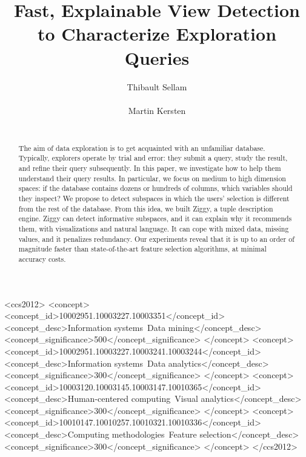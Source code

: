 \documentclass{sig-alternate}
\begin{document}
\title{Fast, Explainable View Detection\\ to Characterize Exploration Queries}

\author{
\alignauthor
Thibault Sellam\\
       \\
\alignauthor
Martin Kersten\\
       \\
}

\maketitle

\begin{abstract} 
The aim of data exploration is to get acquainted with an unfamiliar
database.  Typically, explorers operate by trial and error: they submit a
query, study the result, and refine their query subsequently. In this
paper, we investigate how to help them understand their query results.  In
particular, we focus on medium to high dimension spaces: if the database
contains dozens or hundreds of columns, which variables should they
inspect? We propose to detect subspaces in which the users' selection is
different  from the rest of the database. From this idea, we built Ziggy, a
tuple description engine.  Ziggy can detect informative subspaces, and it
can explain why it recommends them, with visualizations and natural
language.  It can cope with mixed data, missing values, and it penalizes
redundancy. Our experiments reveal that it is up to
an order of magnitude faster than state-of-the-art feature selection
algorithms, at minimal accuracy costs.
\end{abstract}

\begin{CCSXML}
<ccs2012>
<concept>
<concept_id>10002951.10003227.10003351</concept_id>
<concept_desc>Information systems~Data mining</concept_desc>
<concept_significance>500</concept_significance>
</concept>
<concept>
<concept_id>10002951.10003227.10003241.10003244</concept_id>
<concept_desc>Information systems~Data analytics</concept_desc>
<concept_significance>300</concept_significance>
</concept>
<concept>
<concept_id>10003120.10003145.10003147.10010365</concept_id>
<concept_desc>Human-centered computing~Visual analytics</concept_desc>
<concept_significance>300</concept_significance>
</concept>
<concept>
<concept_id>10010147.10010257.10010321.10010336</concept_id>
<concept_desc>Computing methodologies~Feature selection</concept_desc>
<concept_significance>300</concept_significance>
</concept>
</ccs2012>
\end{CCSXML}
\end{document}
